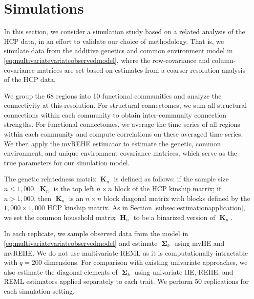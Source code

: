 \documentclass[12pt]{article}
\DeclareMathOperator{\K}{\mathbf{K}}
\DeclareMathOperator{\Hn}{\mathbf{H}}
\DeclareMathOperator{\bSigma}{\mathbf{\Sigma}}
\begin{document}
\vspace{-3.5mm}

\section{Simulations} \label{sec:simulations}

In this section, we consider a simulation study based on a related analysis of the HCP data, in an effort to validate our choice of methodology. That is, we simulate data from the additive genetics and common environment model in \eqref{eq:multivariatevariateobservedmodel}, where the row-covariance and column-covariance matrices are set based on estimates from a coarser-resolution analysis of the HCP data.

We group the 68 regions into 10 functional communities and analyze the connectivity at this resolution. For structural connectomes, we sum all structural connections within each community to obtain inter-community connection strengths. For functional connectomes, we average the time series of all regions within each community and compute correlations on these averaged time series. We then apply the mvREHE estimator to estimate the genetic, common environment, and unique environment covariance matrices, which serve as the true parameters for our simulation model.

The genetic relatedness matrix $\K_n$ is defined as follows: if the sample size $n \leq 1,000$, $\K_n$ is the top left $n \times n$ block of the HCP kinship matrix; if $n > 1,000$, then $\K_n$ is an $n \times n$ block diagonal matrix with blocks defined by the $1,000 \times 1,000$ HCP kinship matrix. As in Section \ref{subsec:estimationapplication}, we set the common household matrix $\Hn_n$ to be a binarized version of $\K_n$.

In each replicate, we sample observed data from the model in \eqref{eq:multivariatevariateobservedmodel} and estimate $\bSigma_k$ using mvHE and mvREHE. We do not use multivariate REML as it is computationally intractable with $q = 200$ dimensions. For comparison with existing univariate approaches, we also estimate the diagonal elements of $\bSigma_k$ using univariate HE, REHE, and REML estimators applied separately to each trait. We perform 50 replications for each simulation setting.






\end{document}
